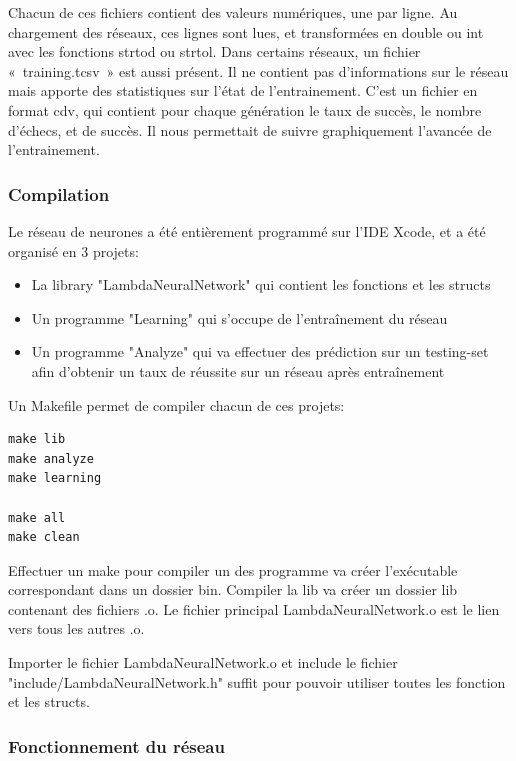 \documentclass{article}
\begin{document}
Chacun de ces fichiers contient des valeurs numériques, une par ligne.
Au chargement des réseaux, ces lignes sont lues, et transformées en double ou int avec les fonctions strtod ou strtol.
Dans certains réseaux, un fichier « training.tcsv » est aussi présent. Il ne contient pas d’informations sur le réseau mais apporte des statistiques sur l’état de l’entrainement. C’est un fichier en format cdv, qui contient pour chaque génération le taux de succès, le nombre d’échecs, et de succès. Il nous permettait de suivre graphiquement l'avancée de l'entrainement.

\newpage

\subsubsection{Compilation}
Le réseau de neurones a été entièrement programmé sur l'IDE Xcode, et a été organisé en 3 projets:


\begin{itemize}
	\item La library "LambdaNeuralNetwork" qui contient les fonctions et les structs
	\item Un programme "Learning" qui s'occupe de l'entraînement du réseau
	\item Un programme "Analyze" qui va effectuer des prédiction sur un testing-set afin d'obtenir un taux de réussite sur un réseau après entraînement
\end{itemize}
Un Makefile permet de compiler chacun de ces projets:

\begin{lstlisting}
make lib
make analyze
make learning

make all
make clean
\end{lstlisting}

Effectuer un make pour compiler un des programme va créer l'exécutable correspondant dans un dossier bin.
Compiler la lib va créer un dossier lib contenant des fichiers .o. Le fichier principal LambdaNeuralNetwork.o est le lien vers tous les autres .o.

Importer le fichier LambdaNeuralNetwork.o et include le fichier "include/LambdaNeuralNetwork.h" suffit pour pouvoir utiliser toutes les fonction et les structs.


\subsubsection{Fonctionnement du réseau}
\end{document}
